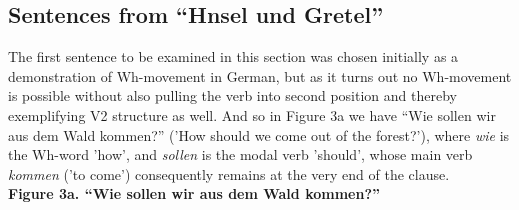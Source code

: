 \documentclass[12pt]{article}
\begin{document}
\begin{flushleft}
\section{Sentences from ``Hnsel und Gretel''}
The first sentence to be examined in this section was chosen initially as a demonstration of Wh-movement in German, but as it turns out no Wh-movement is possible without also pulling the verb into second position and thereby exemplifying V2 structure as well. And so in Figure 3a we have ``Wie sollen wir aus dem Wald kommen?'' ('How should we come out of the forest?'), where {\it wie} is the Wh-word 'how', and {\it sollen} is the modal verb 'should', whose main verb {\it kommen} ('to come') consequently remains at the very end of the clause. \\
{\bf Figure 3a. ``Wie sollen wir aus dem Wald kommen?''}\\
\bigskip
{\centering
{} \\
}
\bigskip

\end{flushleft}
\end{document}
